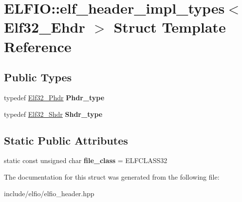 \hypertarget{struct_e_l_f_i_o_1_1elf__header__impl__types_3_01_elf32___ehdr_01_4}{}\section{E\+L\+F\+IO\+:\+:elf\+\_\+header\+\_\+impl\+\_\+types$<$ Elf32\+\_\+\+Ehdr $>$ Struct Template Reference}
\label{struct_e_l_f_i_o_1_1elf__header__impl__types_3_01_elf32___ehdr_01_4}
\subsection*{Public Types}
\begin{DoxyCompactItemize}
\item 
typedef \hyperlink{struct_e_l_f_i_o_1_1_elf32___phdr}{Elf32\+\_\+\+Phdr} {\bfseries Phdr\+\_\+type}\hypertarget{struct_e_l_f_i_o_1_1elf__header__impl__types_3_01_elf32___ehdr_01_4_a29863b014dcfb409b9e7063dcbedfdcd}{}\label{struct_e_l_f_i_o_1_1elf__header__impl__types_3_01_elf32___ehdr_01_4_a29863b014dcfb409b9e7063dcbedfdcd}

\item 
typedef \hyperlink{struct_e_l_f_i_o_1_1_elf32___shdr}{Elf32\+\_\+\+Shdr} {\bfseries Shdr\+\_\+type}\hypertarget{struct_e_l_f_i_o_1_1elf__header__impl__types_3_01_elf32___ehdr_01_4_ac5cf48a8698f0f7947677e306784aace}{}\label{struct_e_l_f_i_o_1_1elf__header__impl__types_3_01_elf32___ehdr_01_4_ac5cf48a8698f0f7947677e306784aace}

\end{DoxyCompactItemize}
\subsection*{Static Public Attributes}
\begin{DoxyCompactItemize}
\item 
static const unsigned char {\bfseries file\+\_\+class} = E\+L\+F\+C\+L\+A\+S\+S32\hypertarget{struct_e_l_f_i_o_1_1elf__header__impl__types_3_01_elf32___ehdr_01_4_a98a44bc25c8487143bda120bbb8d602b}{}\label{struct_e_l_f_i_o_1_1elf__header__impl__types_3_01_elf32___ehdr_01_4_a98a44bc25c8487143bda120bbb8d602b}

\end{DoxyCompactItemize}


The documentation for this struct was generated from the following file\+:\begin{DoxyCompactItemize}
\item 
include/elfio/elfio\+\_\+header.\+hpp\end{DoxyCompactItemize}
